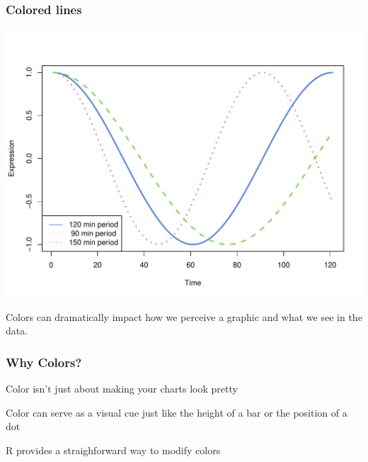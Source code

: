 \documentclass[12pt]{beamer}\usepackage[]{graphicx}\usepackage[]{color}
\newenvironment{knitrout}{}{} %
\begin{document}
\begin{frame}[fragile]
\frametitle{Colored lines}
\begin{knitrout}\scriptsize
{}\color{fgcolor}

{\centering \includegraphics[width=.9\linewidth,height=.7\linewidth]{figure/lines_colored1-1} 

}



\end{knitrout}
\end{frame}


\begin{frame}
  \begin{center}
    {\Large Colors can dramatically impact how we perceive a graphic and what we see in the data.}
  \end{center}
\end{frame}


\begin{frame}
\frametitle{Why Colors?}

 \bbi
  \item Color isn't just about making your charts look pretty
  \item Color can serve as a visual cue just like the height of a bar or the position of a dot
  \item R provides a straighforward way to modify colors
 \ei
\eb

\end{frame}
\end{document}
